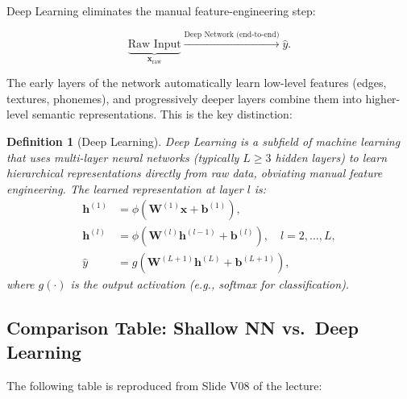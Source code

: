 \documentclass[12pt,a4paper]{article}
\newtheorem{definition}{Definition}[section]
\begin{document}
Deep Learning eliminates the manual feature-engineering step:

\begin{equation}
  \label{eq:dl_pipeline}
  \underbrace{\text{Raw Input}}_{\mathbf{x}_\mathrm{raw}}
  \xrightarrow{\text{Deep Network (end-to-end)}}
  \hat{y}.
\end{equation}

The early layers of the network automatically learn low-level features
(edges, textures, phonemes), and progressively deeper layers combine them
into higher-level semantic representations.  This is the key distinction:

\begin{definition}[Deep Learning]
\label{def:deep_learning}
\emph{Deep Learning} is a subfield of machine learning that uses multi-layer
neural networks (typically $L \geq 3$ hidden layers) to learn hierarchical
representations directly from raw data, obviating manual feature engineering.
The learned representation at layer $l$ is:
\begin{align}
  \label{eq:hierarchical}
  \mathbf{h}^{(1)} &= \phi\!\left(\mathbf{W}^{(1)}\mathbf{x} + \mathbf{b}^{(1)}\right), \\
  \mathbf{h}^{(l)} &= \phi\!\left(\mathbf{W}^{(l)}\mathbf{h}^{(l-1)} + \mathbf{b}^{(l)}\right),
                    \quad l = 2,\ldots,L, \\
  \hat{y}          &= g\!\left(\mathbf{W}^{(L+1)}\mathbf{h}^{(L)} + \mathbf{b}^{(L+1)}\right),
\end{align}
where $g(\cdot)$ is the output activation (e.g., softmax for classification).
\end{definition}

\subsection{Comparison Table: Shallow NN vs.\ Deep Learning}
\label{subsec:comparison}

The following table is reproduced from Slide V08 of the lecture:
\end{document}
